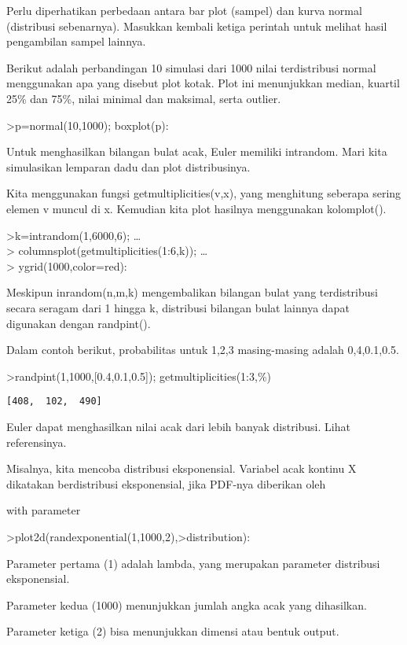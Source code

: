 \documentclass[
]{book}
\begin{document}
Perlu diperhatikan perbedaan antara bar plot (sampel) dan kurva normal (distribusi sebenarnya). Masukkan kembali ketiga perintah untuk melihat hasil pengambilan sampel lainnya.

Berikut adalah perbandingan 10 simulasi dari 1000 nilai terdistribusi normal menggunakan apa yang disebut plot kotak. Plot ini menunjukkan median, kuartil 25\% dan 75\%, nilai minimal dan maksimal, serta outlier.

\textgreater p=normal(10,1000); boxplot(p):

Untuk menghasilkan bilangan bulat acak, Euler memiliki intrandom. Mari kita simulasikan lemparan dadu dan plot distribusinya.

Kita menggunakan fungsi getmultiplicities(v,x), yang menghitung seberapa sering elemen v muncul di x. Kemudian kita plot hasilnya menggunakan kolomplot().

\textgreater k=intrandom(1,6000,6); \ldots{}\\
\textgreater{} columnsplot(getmultiplicities(1:6,k)); \ldots{}\\
\textgreater{} ygrid(1000,color=red):

Meskipun inrandom(n,m,k) mengembalikan bilangan bulat yang terdistribusi secara seragam dari 1 hingga k, distribusi bilangan bulat lainnya dapat digunakan dengan randpint().

Dalam contoh berikut, probabilitas untuk 1,2,3 masing-masing adalah 0,4,0.1,0.5.

\textgreater randpint(1,1000,{[}0.4,0.1,0.5{]}); getmultiplicities(1:3,\%)

\begin{verbatim}
[408,  102,  490]
\end{verbatim}

Euler dapat menghasilkan nilai acak dari lebih banyak distribusi. Lihat referensinya.

Misalnya, kita mencoba distribusi eksponensial. Variabel acak kontinu X dikatakan berdistribusi eksponensial, jika PDF-nya diberikan oleh

with parameter

\textgreater plot2d(randexponential(1,1000,2),\textgreater distribution):

Parameter pertama (1) adalah lambda, yang merupakan parameter distribusi eksponensial.

Parameter kedua (1000) menunjukkan jumlah angka acak yang dihasilkan.

Parameter ketiga (2) bisa menunjukkan dimensi atau bentuk output.
\end{document}
